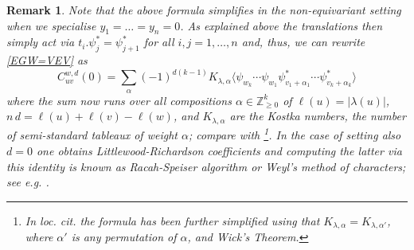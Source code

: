 \documentclass[12pt]{amsart}
\newcommand{\Z}{\mathbb{Z}}
\newtheorem{remark}{Remark}[section]
\numberwithin{equation}{section}
\numberwithin{figure}{section}
\begin{document}
\begin{remark}\rm
Note that the above formula simplifies in the non-equivariant setting when we specialise $y_1=\ldots=y_n=0$. As explained above the translations then simply act via $t_i.\psi^*_j=\psi^*_{j+1}$ for all $i,j=1,\ldots,n$ and, thus, we can rewrite \eqref{EGW=VEV} as
\[
C_{uv}^{w,d}(0)=\sum_{\alpha}
(-1)^{d(k-1)}K_{\lambda,\alpha}\langle\psi_{w_k}\cdots\psi_{w_1}\psi^{*}_{v_1+\alpha_1} \cdots\psi^*_{v_k+\alpha_k}\rangle
\]
where the sum now runs over all compositions $\alpha\in\Z^k_{\ge 0}$ of $\ell(u)=|\lambda(u)|$, $n\,d=\ell(u)+\ell(v)-\ell(w)$, and $K_{\lambda,\alpha}$ are the {\em Kostka numbers}, the number of semi-standard tableaux of weight $\alpha$; compare with \cite[Cor.1.4]{Korff09}\footnote{In loc. cit. the formula has been further simplified using that $K_{\lambda,\alpha}=K_{\lambda,\alpha'}$, where $\alpha'$ is any permutation of $\alpha$, and Wick's Theorem.}. In the case of setting also $d=0$ one obtains Littlewood-Richardson coefficients and computing the latter via this identity is known as {\em Racah-Speiser algorithm} or {\em Weyl's method of characters}; see e.g. \cite{knapp1996lie}.
\end{remark}

\end{document}
